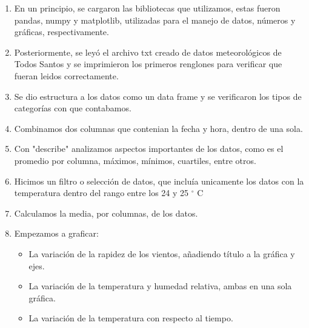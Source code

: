 \documentclass[a4paper]{article}
\begin{document}
\begin{enumerate}
\item En un principio, se cargaron las bibliotecas que utilizamos, estas fueron pandas, numpy y matplotlib, utilizadas para el manejo de datos, números y gráficas, respectivamente.
\item Posteriormente, se leyó el archivo txt creado de datos meteorológicos de Todos Santos y se imprimieron los primeros renglones para verificar que fueran leidos correctamente.
\item Se dio estructura a los datos como un data frame y se verificaron los tipos de categorías con que contabamos. 
\item Combinamos dos columnas que contenian la fecha y hora, dentro de una sola.
\item Con "describe" analizamos aspectos importantes de los datos, como es el promedio por columna, máximos, mínimos, cuartiles, entre otros.
\item Hicimos un filtro o selección de datos, que incluía unicamente los datos con la temperatura dentro del rango entre los 24 y 25 $^{\circ}$ C
\item Calculamos la media, por columnas, de los datos.
\item Empezamos a graficar: 
\begin{itemize}
\item La variación de la rapidez de los vientos, añadiendo título a la gráfica y ejes.
\item La variación de la temperatura y humedad relativa, ambas en una sola gráfica.
\item La variación de la temperatura con respecto al tiempo.
\end{itemize}
\end{enumerate}
\end{document}
